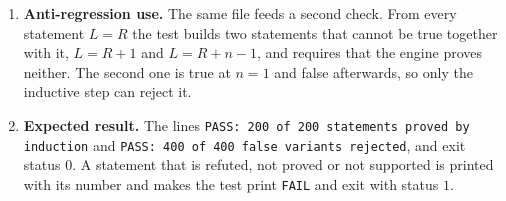 \documentclass[11pt,a4paper]{article}
\begin{document}
\begin{enumerate}
\item \textbf{Anti-regression use.} The same file feeds a second check. From every statement $L = R$ the test builds two statements that cannot be true together with it, $L = R + 1$ and $L = R + n - 1$, and requires that the engine proves neither. The second one is true at $n = 1$ and false afterwards, so only the inductive step can reject it.

\item \textbf{Expected result.} The lines \texttt{PASS: 200 of 200 statements proved by induction} and \texttt{PASS: 400 of 400 false variants rejected}, and exit status $0$. A statement that is refuted, not proved or not supported is printed with its number and makes the test print \texttt{FAIL} and exit with status $1$.
\end{enumerate}
\end{document}
